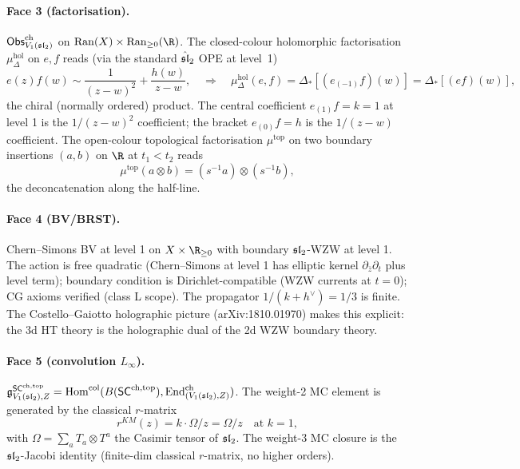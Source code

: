 \paragraph{Face 3 (factorisation).} $\mathsf{Obs}^{\mathrm{ch}}_{V_1(\mathfrak{sl}_2)}$ on $\Ran(X) \times \Ran_{\ge 0}(\R)$. The closed-colour holomorphic factorisation $\mu^{\mathrm{hol}}_\Delta$ on $e, f$ reads (via the standard $\hat{\mathfrak{sl}}_2$ OPE at level~1)
\[
e(z) f(w) \sim \frac{1}{(z - w)^2} + \frac{h(w)}{z - w}, \quad\Rightarrow\quad \mu^{\mathrm{hol}}_\Delta(e, f) = \Delta_*[(e_{(-1)} f)(w)] = \Delta_*[(ef)(w)],
\]
the chiral (normally ordered) product. The central coefficient $e_{(1)} f = k = 1$ at level 1 is the $1/(z - w)^2$ coefficient; the bracket $e_{(0)} f = h$ is the $1/(z - w)$ coefficient. The open-colour topological factorisation $\mu^{\mathrm{top}}$ on two boundary insertions $(a, b)$ on $\R$ at $t_1 < t_2$ reads
\[
\mu^{\mathrm{top}}(a \otimes b) = (s^{-1} a) \otimes (s^{-1} b),
\]
the deconcatenation along the half-line.

\paragraph{Face 4 (BV/BRST).} Chern--Simons BV at level 1 on $X \times \R_{\ge 0}$ with boundary $\mathfrak{sl}_2$-WZW at level 1. The action is free quadratic (Chern--Simons at level 1 has elliptic kernel $\partial_{\bar z} \partial_t$ plus level term); boundary condition is Dirichlet-compatible (WZW currents at $t = 0$); CG axioms verified (class L scope). The propagator $1/(k + h^\vee) = 1/3$ is finite. The Costello--Gaiotto holographic picture (arXiv:1810.01970) makes this explicit: the 3d HT theory is the holographic dual of the 2d WZW boundary theory.

\paragraph{Face 5 (convolution $L_\infty$).} $\mathfrak{g}^{\mathsf{SC}^{\mathrm{ch},\mathrm{top}}}_{V_1(\mathfrak{sl}_2), Z} = \mathrm{Hom}^{\mathrm{col}}(B(\mathsf{SC}^{\mathrm{ch},\mathrm{top}}), \mathrm{End}^{\mathrm{ch}}_{(V_1(\mathfrak{sl}_2), Z)})$. The weight-2 MC element is generated by the classical $r$-matrix
\[
r^{KM}(z) = k \cdot \Omega / z = \Omega / z \quad \text{at } k = 1,
\]
with $\Omega = \sum_a T_a \otimes T^a$ the Casimir tensor of $\mathfrak{sl}_2$. The weight-3 MC closure is the $\mathfrak{sl}_2$-Jacobi identity (finite-dim classical $r$-matrix, no higher orders).

